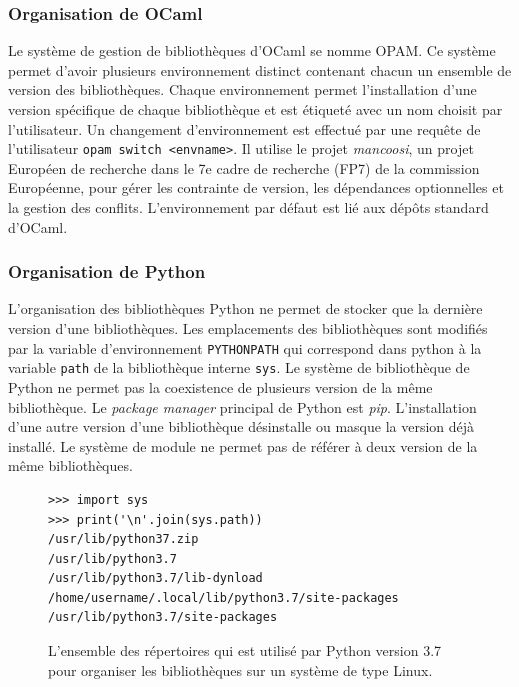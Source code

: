 \subsubsection{Organisation de OCaml}
Le système de gestion de bibliothèques d'OCaml se nomme OPAM. Ce système permet d'avoir
plusieurs environnement distinct contenant chacun un ensemble de version des bibliothèques.
Chaque environnement permet l'installation d'une version spécifique de chaque bibliothèque et
est étiqueté avec un nom choisit par l'utilisateur. Un changement d'environnement est
effectué par une requête de l'utilisateur \verb|opam switch <envname>|. Il utilise
le projet \textit{mancoosi}, un projet Européen de recherche dans le 7e cadre de recherche (FP7)
de la commission Européenne, pour gérer les contrainte de version, les dépendances optionnelles
et la gestion des conflits. L'environnement par défaut est lié aux dépôts standard d'OCaml.

\subsubsection{Organisation de Python}
L'organisation des bibliothèques Python ne permet de stocker que la dernière version
d'une bibliothèques. Les emplacements des bibliothèques sont modifiés par la variable d'environnement
\verb|PYTHONPATH| qui correspond dans python à la variable \verb|path| de la bibliothèque
interne \verb|sys|. Le système de bibliothèque de Python ne permet pas la coexistence de plusieurs
version de la même bibliothèque. Le \textit{package manager} principal de Python est \textit{pip}.
L'installation d'une autre version d'une bibliothèque désinstalle
ou masque la version déjà installé. Le système de module ne permet pas de référer à deux version
de la même bibliothèques.

\begin{figure}[ht]
    \begin{minipage}[t]{0.5\textwidth}
\begin{verbatim}
>>> import sys
>>> print('\n'.join(sys.path))
/usr/lib/python37.zip
/usr/lib/python3.7
/usr/lib/python3.7/lib-dynload
/home/username/.local/lib/python3.7/site-packages
/usr/lib/python3.7/site-packages
\end{verbatim}
    \end{minipage}
    \caption{L'ensemble des répertoires qui est utilisé par Python version 3.7
    pour organiser les bibliothèques sur un système de type Linux.}
\end{figure}


